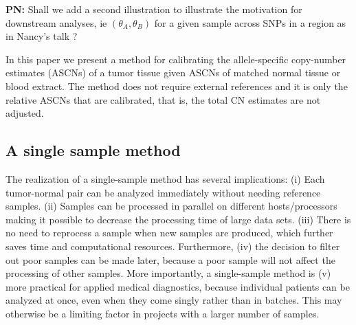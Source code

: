 \documentclass[10pt]{bmc_article}
\newenvironment{bmcformat}{\fussy\setboolean{publ}{true}}{\fussy}
\newenvironment{PN}{\color{blue}\textbf{PN:}}{}
\begin{document}
\begin{bmcformat}
\begin{PN}
  Shall we add a second illustration to illustrate the motivation for downstream analyses, ie  $(\theta_A,\theta_B)$ for a given sample across SNPs in a region as in Nancy's talk ?
\end{PN}

In this paper we present a method for calibrating the allele-specific copy-number estimates (ASCNs) of a tumor tissue given ASCNs of matched normal tissue or blood extract.  The method does not require external references and it is only the relative ASCNs that are calibrated, that is, the total CN estimates are not adjusted.



\subsection*{A single sample method}
The realization of a single-sample method has several implications:
(i) Each tumor-normal pair can be analyzed immediately without needing reference samples.
(ii) Samples can be processed in parallel on different hosts/processors making it possible to decrease the processing time of large data sets.
(iii) There is no need to reprocess a sample when new samples are produced, which further saves time and computational resources.
Furthermore, (iv) the decision to filter out poor samples can be made later, because a poor sample will not affect the processing of other samples.
More importantly, a single-sample method is
(v) more practical for applied medical diagnostics, because individual patients can be analyzed at once, even when they come singly rather than in batches.  This may otherwise be a limiting factor in projects with a larger number of samples.


\end{bmcformat}
\end{document}
